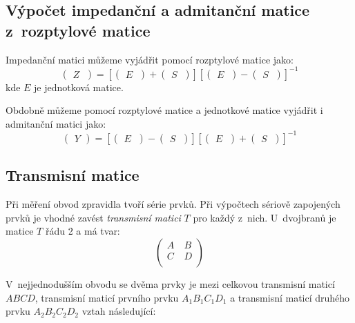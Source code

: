 \documentclass{protokol}
\begin{document}
\subsection{Výpočet impedanční a admitanční matice z~rozptylové matice}

Impedanční matici můžeme vyjádřit pomocí rozptylové matice jako:
\[
\begin{pmatrix}
	Z~\end{pmatrix}
=
[\begin{pmatrix}
	E~\end{pmatrix}
+
\begin{pmatrix}
	S~\end{pmatrix}]
%
[\begin{pmatrix}
	E~\end{pmatrix}
-
\begin{pmatrix}
	S~\end{pmatrix}]^{-1}
\]
kde $E$ je jednotková matice.
\bigskip

Obdobně můžeme pomocí rozptylové matice a jednotkové matice
vyjádřit i admitanční matici jako:
\[
\begin{pmatrix}
	Y
\end{pmatrix}
=
[\begin{pmatrix}
	E~\end{pmatrix}
-
\begin{pmatrix}
	S~\end{pmatrix}]
%
[\begin{pmatrix}
	E~\end{pmatrix}
+
\begin{pmatrix}
	S~\end{pmatrix}]^{-1}
\]

\subsection{Transmisní matice}
Při měření obvod zpravidla tvoří série prvků.
Při výpočtech sériově zapojených prvků je vhodné zavést
\emph{transmisní matici} $T$ pro každý z~nich.
U~dvojbranů je matice $T$ řádu 2 a má tvar:
\[
\begin{pmatrix}
	A~& B  \\
	C &	D  \\
\end{pmatrix}
\]

V~nejjednodušším obvodu se dvěma prvky je mezi celkovou transmisní
maticí $ABCD$, transmisní maticí prvního prvku $A_1B_1C_1D_1$
a transmisní maticí druhého prvku $A_2B_2C_2D_2$ vztah následující:
\end{document}
